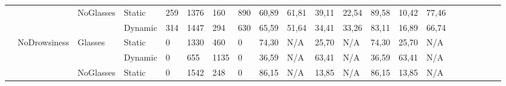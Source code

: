 \documentclass[12pt]{article}
\begin{document}
\begin{landscape}
\begin{table}[]
\begin{adjustbox}{width=1.4\textwidth}
\begin{tabular}{lllllllllllllllccllll}
				\multicolumn{1}{|l|}{} & \multicolumn{1}{l|}{} & \multicolumn{1}{l|}{\multirow{2}{*}{NoGlasses}} & \multicolumn{1}{l|}{Static} & \multicolumn{1}{l|}{259} & \multicolumn{1}{l|}{1376} & \multicolumn{1}{l|}{160} & \multicolumn{1}{l|}{890} & \multicolumn{1}{l|}{60,89} & \multicolumn{1}{l|}{61,81} & \multicolumn{1}{l|}{39,11} & \multicolumn{1}{l|}{22,54} & \multicolumn{1}{l|}{89,58} & \multicolumn{1}{l|}{10,42} & \multicolumn{1}{l|}{77,46} & \multicolumn{1}{c|}{} & \multicolumn{1}{c|}{} & \multicolumn{1}{l|}{} & \multicolumn{1}{l|}{} & \multicolumn{1}{l|}{} & \multicolumn{1}{l|}{} \\ \cline{4-15}
				\multicolumn{1}{|l|}{} & \multicolumn{1}{l|}{} & \multicolumn{1}{l|}{} & \multicolumn{1}{l|}{Dynamic} & \multicolumn{1}{l|}{314} & \multicolumn{1}{l|}{1447} & \multicolumn{1}{l|}{294} & \multicolumn{1}{l|}{630} & \multicolumn{1}{l|}{65,59} & \multicolumn{1}{l|}{51,64} & \multicolumn{1}{l|}{34,41} & \multicolumn{1}{l|}{33,26} & \multicolumn{1}{l|}{83,11} & \multicolumn{1}{l|}{16,89} & \multicolumn{1}{l|}{66,74} & \multicolumn{1}{c|}{} & \multicolumn{1}{c|}{} & \multicolumn{1}{l|}{} & \multicolumn{1}{l|}{} & \multicolumn{1}{l|}{} & \multicolumn{1}{l|}{} \\ \cline{2-15}
				\multicolumn{1}{|l|}{} & \multicolumn{1}{l|}{\multirow{4}{*}{NoDrowsiness}} & \multicolumn{1}{l|}{\multirow{2}{*}{Glasses}} & \multicolumn{1}{l|}{Static} & \multicolumn{1}{l|}{0} & \multicolumn{1}{l|}{1330} & \multicolumn{1}{l|}{460} & \multicolumn{1}{l|}{0} & \multicolumn{1}{l|}{74,30} & \multicolumn{1}{l|}{N/A} & \multicolumn{1}{l|}{25,70} & \multicolumn{1}{l|}{N/A} & \multicolumn{1}{l|}{74,30} & \multicolumn{1}{l|}{25,70} & \multicolumn{1}{l|}{N/A} & \multicolumn{1}{c|}{} & \multicolumn{1}{c|}{} & \multicolumn{1}{l|}{} & \multicolumn{1}{l|}{} & \multicolumn{1}{l|}{} & \multicolumn{1}{l|}{} \\ \cline{4-15}
				\multicolumn{1}{|l|}{} & \multicolumn{1}{l|}{} & \multicolumn{1}{l|}{} & \multicolumn{1}{l|}{Dynamic} & \multicolumn{1}{l|}{0} & \multicolumn{1}{l|}{655} & \multicolumn{1}{l|}{1135} & \multicolumn{1}{l|}{0} & \multicolumn{1}{l|}{36,59} & \multicolumn{1}{l|}{N/A} & \multicolumn{1}{l|}{63,41} & \multicolumn{1}{l|}{N/A} & \multicolumn{1}{l|}{36,59} & \multicolumn{1}{l|}{63,41} & \multicolumn{1}{l|}{N/A} & \multicolumn{1}{c|}{} & \multicolumn{1}{c|}{} & \multicolumn{1}{l|}{} & \multicolumn{1}{l|}{} & \multicolumn{1}{l|}{} & \multicolumn{1}{l|}{} \\ \cline{3-15}
				\multicolumn{1}{|l|}{} & \multicolumn{1}{l|}{} & \multicolumn{1}{l|}{\multirow{2}{*}{NoGlasses}} & \multicolumn{1}{l|}{Static}  & \multicolumn{1}{l|}{0} & \multicolumn{1}{l|}{1542} & \multicolumn{1}{l|}{248} & \multicolumn{1}{l|}{0} & \multicolumn{1}{l|}{86,15} & \multicolumn{1}{l|}{N/A} & \multicolumn{1}{l|}{13,85} & \multicolumn{1}{l|}{N/A} & \multicolumn{1}{l|}{86,15} & \multicolumn{1}{l|}{13,85} & \multicolumn{1}{l|}{N/A} & \multicolumn{1}{c|}{} & \multicolumn{1}{c|}{} & \multicolumn{1}{l|}{} & \multicolumn{1}{l|}{} & \multicolumn{1}{l|}{} & \multicolumn{1}{l|}{} \\ \cline{4-15}

\end{tabular}
\end{adjustbox}
\end{table}
\end{landscape}
\end{document}
